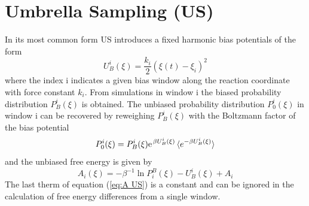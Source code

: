 \section{Umbrella Sampling (US)}
In its most common form US introduces a fixed harmonic bias potentials of the form
\begin{equation}
  U_{B}^i(\xi) = \frac{k_i}{2}(\xi(t)-\xi_i)^2
\end{equation}
where the index i indicates a given bias window along the reaction coordinate with force constant $k_i$.\autocite{kastner2011umbrella} From simulations in window i the biased probability distribution $P_B^i(\xi)$ is obtained.
The unbiased probability distribution $P_{0}^{i}(\xi)$ in window i can be recovered by reweighing $P_B^i(\xi)$ with the Boltzmann factor of the bias potential
\begin{equation}
  P_{0}^{i}(\xi) = P_B^i(\xi) \e^{\beta U_B^i(\xi)}\braket{e^{-\beta U_B^i(\xi)}}
\end{equation}
and the unbiased free energy is given by
\begin{equation}
  A_i(\xi) = -\beta^{-1}\ln P_i^B(\xi) - U_B^i(\xi) + A_i \label{eq:A US}
\end{equation}
The last therm of equation (\ref{eq:A US}) is a constant and can be ignored in the calculation of free energy differences from a single window.

